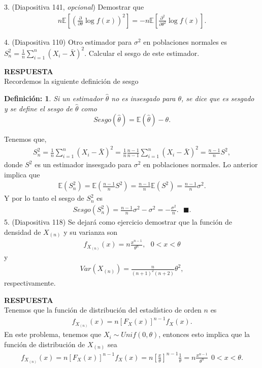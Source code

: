 \documentclass[11pt,letterpaper]{article}
\newcommand{\mE}{\mathbb{E}}
\newcommand{\res}{\textbf{RESPUESTA}\\}
\newcommand{\finf}{\blacksquare.}
\newtheorem{thmd}{Definición:}
\begin{document}
3. (Diapositiva 141, \textit{opcional}) Demostrar que 
\begin{align*}
n\mE\left[ \left(\frac{\partial}{\partial \theta} \log f(x)\right)^2 \right]= -n\mE\left[\frac{\partial^2}{\partial \theta^2} \log f(x) \right].
\end{align*}

4. (Diapositiva 110) Otro estimador para $\sigma^2$ en poblaciones normales es $S_n^2 = \frac{1}{n} \sum_{i=1}^n(X_i-\bar{X})^2.$ Calcular el sesgo de este estimador.

\res Recordemos la siguiente definición de sesgo
\begin{framed}
    \begin{thmd} \label{sesgo}
    Si un estimador $\hat{\theta}$ no es insesgado para $\theta$, se dice que es sesgado y se define el sesgo de $\hat{\theta}$ como
    $$Sesgo(\hat{\theta})=\mE(\hat{\theta})-\theta.$$
    \end{thmd}
\end{framed}
Tenemos que,
\begin{align*}
S_n^2 = \frac{1}{n} \sum_{i=1}^n(X_i-\bar{X})^2=\frac{1}{n}\frac{n-1}{n-1} \sum_{i=1}^n(X_i-\bar{X})^2=\frac{n-1}{n}S^2,
\end{align*}
donde $S^2$ es un estimador insesgado para $\sigma^2$ en poblaciones normales. Lo anterior implica que 
\begin{align*}
\mE(S_n^2)=\mE\left(\frac{n-1}{n}S^2 \right)=\frac{n-1}{n}\mE\left(S^2 \right)=\frac{n-1}{n}\sigma^2.
\end{align*}
Y por lo tanto el sesgo de $S_n^2$ es
\begin{align*}
Sesgo(S_n^2)=\frac{n-1}{n}\sigma^2-\sigma^2=-\frac{\sigma^2}{n}.\ \ \ \finf
\end{align*}
5. (Diapositiva 118) Se dejará como ejercicio demostrar que la función de densidad de $X_{(n)}$ y su varianza son
\begin{align*}
f_{X_{(n)}}(x)=n\frac{x^{n-1}}{\theta^n}, \ \ \ 0<x<\theta
\end{align*}
y 
\begin{align*}
Var(X_{(n)})=\frac{n}{(n+1)^2(n+2)}\theta^2,
\end{align*}
respectivamente.

\res Tenemos que la función de distribución del estadístico de orden $n$ es
\begin{align*}
f_{X_{(n)}}(x) = n [F_X(x)]^{n-1}f_X(x).
\end{align*}
En este problema, tenemos que $X_i\sim Unif(0,\theta)$, entonces esto implica que la función de distribución de $X_{(n)}$ sea
\begin{align*}
f_{X_{(n)}}(x) = n [F_X(x)]^{n-1}f_X(x)=n\left[\frac{x}{\theta}\right]^{n-1} \frac{1}{\theta}=n\frac{x^{n-1}}{\theta^n} \ \  0<x<\theta. 
\end{align*}
\end{document}
